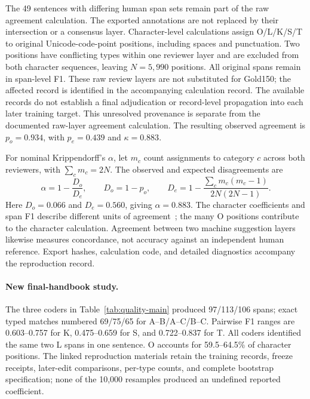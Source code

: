 The 49 sentences with differing human span sets remain part of the raw agreement calculation. The exported annotations are not replaced by their intersection or a consensus layer. Character-level calculations assign O/L/K/S/T to original Unicode-code-point positions, including spaces and punctuation. Two positions have conflicting types within one reviewer layer and are excluded from both character sequences, leaving $N=5{,}990$ positions. All original spans remain in span-level F1. These raw review layers are not substituted for Gold150; the affected record is identified in the accompanying calculation record. The available records do not establish a final adjudication or record-level propagation into each later training target. This unresolved provenance is separate from the documented raw-layer agreement calculation. The resulting observed agreement is $p_o=0.934$, with $p_e=0.439$ and $\kappa=0.883$.

For nominal Krippendorff's $\alpha$, let $m_c$ count assignments to category $c$ across both reviewers, with $\sum_c m_c=2N$. The observed and expected disagreements are
\begin{equation}
\alpha=1-\frac{D_o}{D_e},\qquad
D_o=1-p_o,\qquad
D_e=1-\frac{\sum_c m_c(m_c-1)}{2N(2N-1)}.
\label{eq:qa150-alpha}
\end{equation}
Here $D_o=0.066$ and $D_e=0.560$, giving $\alpha=0.883$. The character coefficients and span F1 describe different units of agreement~\citep{artstein2008agreement}; the many O positions contribute to the character calculation. Agreement between two machine suggestion layers likewise measures concordance, not accuracy against an independent human reference. Export hashes, calculation code, and detailed diagnostics accompany the reproduction record.

\paragraph{New final-handbook study.}
The three coders in Table~\ref{tab:quality-main} produced 97/113/106 spans; exact typed matches numbered 69/75/65 for A--B/A--C/B--C. Pairwise F1 ranges are 0.603--0.757 for K, 0.475--0.659 for S, and 0.722--0.837 for T. All coders identified the same two L spans in one sentence. O accounts for 59.5--64.5\% of character positions. The linked reproduction materials retain the training records, freeze receipts, later-edit comparisons, per-type counts, and complete bootstrap specification; none of the 10,000 resamples produced an undefined reported coefficient.

\FloatBarrier
